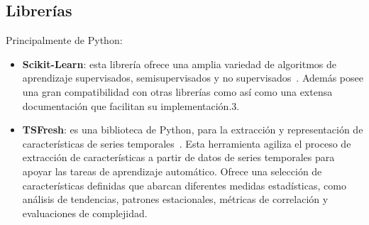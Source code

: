 \subsection{Librerías}
Principalmente de Python:
\begin{itemize}
\item \textbf{Scikit-Learn}: esta librería ofrece una amplia variedad de algoritmos de aprendizaje supervisados, semisupervisados y no supervisados~\cite{sklearnHome}. Además posee una gran compatibilidad con otras librerías como así como una extensa documentación que facilitan su implementación.3.
\item \textbf{TSFresh}: es una biblioteca de Python, para la extracción y representación de características de series temporales~\cite{tsfreshHome}. Esta herramienta agiliza el proceso de extracción de características a partir de datos de series temporales para apoyar las tareas de aprendizaje automático. Ofrece una selección de características definidas que abarcan diferentes medidas estadísticas, como análisis de tendencias, patrones estacionales, métricas de correlación y evaluaciones de complejidad.
\end{itemize}
